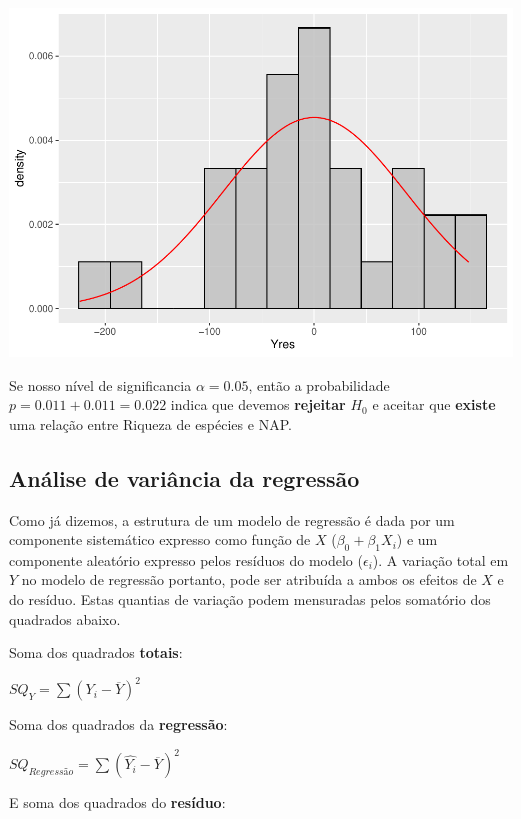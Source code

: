 \documentclass[
]{book}
\begin{document}
\begin{center}\includegraphics{probest-cambientais_files/figure-latex/unnamed-chunk-158-1} \end{center}

Se nosso nível de significancia \(\alpha = 0.05\), então a probabilidade \(p = 0.011 + 0.011 = 0.022\) indica que devemos \textbf{rejeitar} \(H_0\) e aceitar que \textbf{existe} uma relação entre Riqueza de espécies e NAP.

\hypertarget{anuxe1lise-de-variuxe2ncia-da-regressuxe3o}{%
\subsection{Análise de variância da regressão}\label{anuxe1lise-de-variuxe2ncia-da-regressuxe3o}}

Como já dizemos, a estrutura de um modelo de regressão é dada por um componente sistemático expresso como função de \(X\) (\(\beta_0 + \beta_1X_i\)) e um componente aleatório expresso pelos resíduos do modelo (\(\epsilon_i\)). A variação total em \(Y\) no modelo de regressão portanto, pode ser atribuída a ambos os efeitos de \(X\) e do resíduo. Estas quantias de variação podem mensuradas pelos somatório dos quadrados abaixo.

Soma dos quadrados \textbf{totais}:

\(SQ_Y = \sum{(Y_i - \overline{Y})^2}\)

Soma dos quadrados da \textbf{regressão}:

\(SQ_{Regressão}= \sum{(\hat{Y_i} - \overline{Y})^2}\)

E soma dos quadrados do \textbf{resíduo}:
\end{document}
